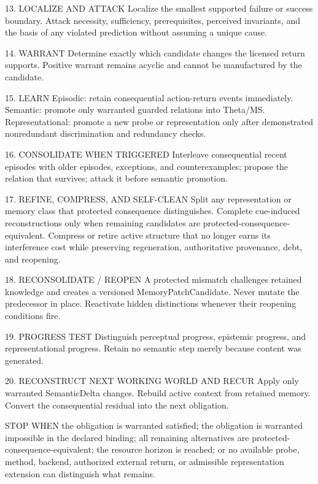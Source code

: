 \documentclass[
]{article}
\newenvironment{Shaded}{}{}
\newcommand{\NormalTok}[1]{#1}
\begin{document}
\begin{Shaded}
\begin{Highlighting}[]
\NormalTok{13. LOCALIZE AND ATTACK}
\NormalTok{    Localize the smallest supported failure or success boundary.}
\NormalTok{    Attack necessity, sufficiency, prerequisites, perceived invariants, and}
\NormalTok{    the basis of any violated prediction without assuming a unique cause.}

\NormalTok{14. WARRANT}
\NormalTok{    Determine exactly which candidate changes the licensed return supports.}
\NormalTok{    Positive warrant remains acyclic and cannot be manufactured by the candidate.}

\NormalTok{15. LEARN}
\NormalTok{    Episodic: retain consequential action-return events immediately.}
\NormalTok{    Semantic: promote only warranted guarded relations into Theta/MS.}
\NormalTok{    Representational: promote a new probe or representation only after}
\NormalTok{    demonstrated nonredundant discrimination and redundancy checks.}

\NormalTok{16. CONSOLIDATE WHEN TRIGGERED}
\NormalTok{    Interleave consequential recent episodes with older episodes, exceptions,}
\NormalTok{    and counterexamples; propose the relation that survives; attack it before}
\NormalTok{    semantic promotion.}

\NormalTok{17. REFINE, COMPRESS, AND SELF-CLEAN}
\NormalTok{    Split any representation or memory class that protected consequence distinguishes.}
\NormalTok{    Complete cue-induced reconstructions only when remaining candidates are}
\NormalTok{    protected-consequence-equivalent. Compress or retire active structure that}
\NormalTok{    no longer earns its interference cost while preserving regeneration,}
\NormalTok{    authoritative provenance, debt, and reopening.}

\NormalTok{18. RECONSOLIDATE / REOPEN}
\NormalTok{    A protected mismatch challenges retained knowledge and creates a versioned}
\NormalTok{    MemoryPatchCandidate. Never mutate the predecessor in place.}
\NormalTok{    Reactivate hidden distinctions whenever their reopening conditions fire.}

\NormalTok{19. PROGRESS TEST}
\NormalTok{    Distinguish perceptual progress, epistemic progress, and representational}
\NormalTok{    progress. Retain no semantic step merely because content was generated.}

\NormalTok{20. RECONSTRUCT NEXT WORKING WORLD AND RECUR}
\NormalTok{    Apply only warranted SemanticDelta changes.}
\NormalTok{    Rebuild active context from retained memory.}
\NormalTok{    Convert the consequential residual into the next obligation.}

\NormalTok{STOP WHEN}
\NormalTok{    the obligation is warranted satisfied;}
\NormalTok{    the obligation is warranted impossible in the declared binding;}
\NormalTok{    all remaining alternatives are protected-consequence-equivalent;}
\NormalTok{    the resource horizon is reached;}
\NormalTok{    or no available probe, method, backend, authorized external return, or}
\NormalTok{    admissible representation extension can distinguish what remains.}
\end{Highlighting}
\end{Shaded}
\end{document}
